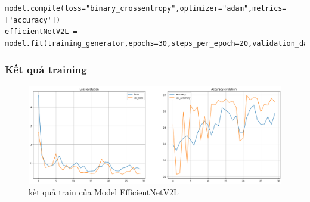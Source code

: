 \begin{lstlisting}
model.compile(loss="binary_crossentropy",optimizer="adam",metrics=['accuracy'])
efficientNetV2L = model.fit(training_generator,epochs=30,steps_per_epoch=20,validation_data=validation_generator)
\end{lstlisting}

\subsubsection{Kết quả training}\newpage
\begin{center}
    \begin{figure}[!h]
        \centering
        \includegraphics[scale = 0.38]{fileanh/efficient.png}
        \caption{kết quả train của Model EfficientNetV2L}
    \end{figure}
\end{center}
